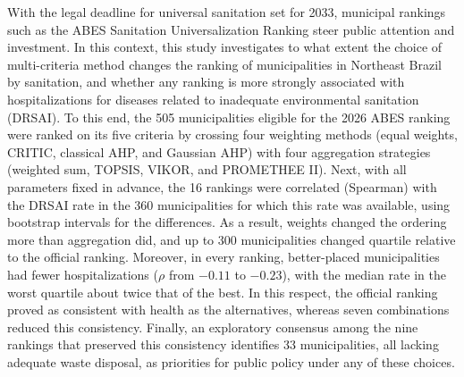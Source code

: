 With the legal deadline for universal sanitation set for 2033,
municipal rankings such as the ABES Sanitation Universalization
Ranking steer public attention and investment. In this context,
this study investigates to what extent the choice of multi-criteria
method changes the ranking of municipalities in Northeast Brazil by
sanitation, and whether any ranking is more strongly associated
with hospitalizations for diseases related to inadequate environmental
sanitation (DRSAI). To this end, the 505 municipalities eligible for
the 2026 ABES ranking were ranked on its five criteria by crossing
four weighting methods (equal weights, CRITIC, classical AHP, and
Gaussian AHP) with four aggregation strategies (weighted sum, TOPSIS,
VIKOR, and PROMETHEE II). Next, with all parameters fixed in advance,
the 16 rankings were correlated (Spearman) with the DRSAI rate in the
360 municipalities for which this rate was available, using bootstrap
intervals for the differences. As a result, weights changed the
ordering more than aggregation did, and up to 300 municipalities
changed quartile relative to the official ranking. Moreover, in every
ranking, better-placed municipalities had fewer hospitalizations
($\rho$ from $-0.11$ to $-0.23$), with the median rate in the worst
quartile about twice that of the best. In this respect, the official
ranking proved as consistent with health as the alternatives, whereas
seven combinations reduced this consistency. Finally, an exploratory
consensus among the nine rankings that preserved this consistency
identifies 33 municipalities, all lacking adequate waste disposal, as
priorities for public policy under any of these choices.